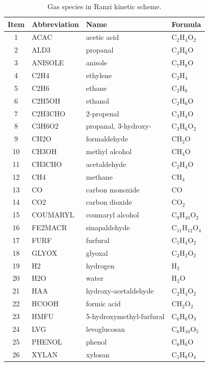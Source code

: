 \begin{table}[H]
	\centering
	\caption{Gas species in Ranzi kinetic scheme.}
	\begin{tabular}{@{}clll@{}}
		\toprule
		Item & Abbreviation & Name & Formula \\
		\midrule
		1	& ACAC 		& acetic acid 				& C$_2$H$_4$O$_2$ \\
		2 	& ALD3 		& propanal 					& C$_3$H$_6$O \\
		3 	& ANISOLE 	& anisole 					& C$_7$H$_8$O \\
		4 	& C2H4 		& ethylene 					& C$_2$H$_4$ \\
		5 	& C2H6 		& ethane 					& C$_2$H$_6$ \\
		6 	& C2H5OH 	& ethanol 					& C$_2$H$_6$O \\
		7 	& C2H3CHO 	& 2-propenal				& C$_3$H$_4$O \\
		8 	& C3H6O2 	& propanal, 3-hydroxy-		& C$_3$H$_6$O$_2$ \\
		9  	& CH2O 		& formaldehyde 				& CH$_2$O \\
		10 	& CH3OH 	& methyl alcohol 			& CH$_4$O \\
		11 	& CH3CHO 	& acetaldehyde 				& C$_2$H$_4$O \\
		12  & CH4 		& methane 					& CH$_4$ \\
		13  & CO 		& carbon monoxide 			& CO \\
		14  & CO2 		& carbon dioxide 			& CO$_2$ \\
		15  & COUMARYL 	& coumaryl alcohol 			& C$_9$H$_{10}$O$_2$ \\
		16 	& FE2MACR 	& sinapaldehyde 			& C$_{11}$H$_{12}$O$_4$	\\
		17 	& FURF 		& furfural 					& C$_5$H$_4$O$_2$	\\
		18 	& GLYOX 	& glyoxal				 	& C$_2$H$_2$O$_2$ \\
		19	& H2 		& hydrogen 				 	& H$_2$ \\
		20	& H2O 		& water 				 	& H$_2$O \\
		21 	& HAA 		& hydroxy-acetaldehyde 		& C$_2$H$_4$O$_2$ \\
		22  & HCOOH 	& formic acid 			 	& CH$_2$O$_2$ \\
		23  & HMFU		& 5-hydroxymethyl-furfural	& C$_6$H$_6$O$_3$ \\
		24 	& LVG		& levoglucosan 			 	& C$_6$H$_{10}$O$_5$ \\
		25	& PHENOL 	& phenol 				 	& C$_6$H$_6$O \\
		26 	& XYLAN 	& xylosan 				 	& C$_5$H$_8$O$_4$ \\
		\bottomrule
	\end{tabular}
\end{table}

